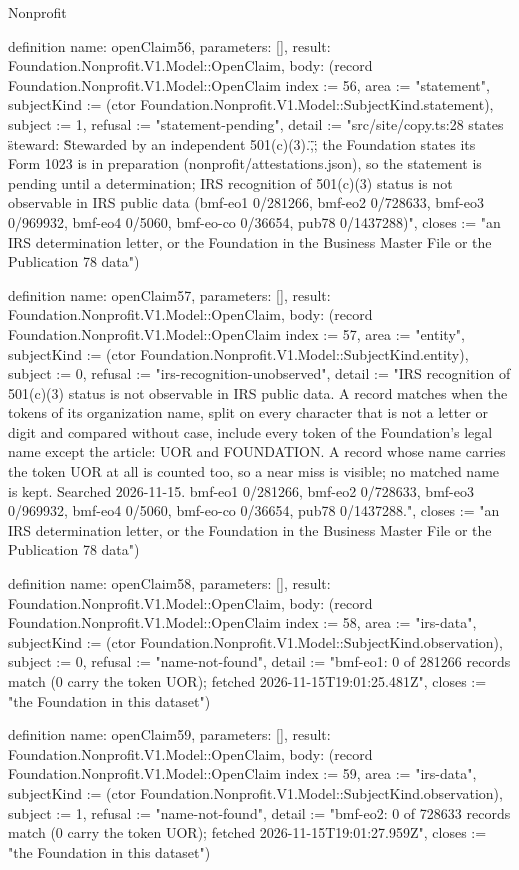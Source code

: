 \begin{lexlean}{Nonprofit}
\begin{semanticmodule}
definition{
  name: openClaim56,
  parameters: [],
  result: Foundation.Nonprofit.V1.Model::OpenClaim,
  body: (record Foundation.Nonprofit.V1.Model::OpenClaim {index := 56, area := "statement", subjectKind := (ctor Foundation.Nonprofit.V1.Model::SubjectKind.statement), subject := 1, refusal := "statement-pending", detail := "src/site/copy.ts:28 states \"steward: \"Stewarded by an independent 501(c)(3).\",\"; the Foundation states its Form 1023 is in preparation (nonprofit/attestations.json), so the statement is pending until a determination; IRS recognition of 501(c)(3) status is not observable in IRS public data (bmf-eo1 0/281266, bmf-eo2 0/728633, bmf-eo3 0/969932, bmf-eo4 0/5060, bmf-eo-co 0/36654, pub78 0/1437288)", closes := "an IRS determination letter, or the Foundation in the Business Master File or the Publication 78 data"})
}

definition{
  name: openClaim57,
  parameters: [],
  result: Foundation.Nonprofit.V1.Model::OpenClaim,
  body: (record Foundation.Nonprofit.V1.Model::OpenClaim {index := 57, area := "entity", subjectKind := (ctor Foundation.Nonprofit.V1.Model::SubjectKind.entity), subject := 0, refusal := "irs-recognition-unobserved", detail := "IRS recognition of 501(c)(3) status is not observable in IRS public data. A record matches when the tokens of its organization name, split on every character that is not a letter or digit and compared without case, include every token of the Foundation's legal name except the article: UOR and FOUNDATION. A record whose name carries the token UOR at all is counted too, so a near miss is visible; no matched name is kept. Searched 2026-11-15. bmf-eo1 0/281266, bmf-eo2 0/728633, bmf-eo3 0/969932, bmf-eo4 0/5060, bmf-eo-co 0/36654, pub78 0/1437288.", closes := "an IRS determination letter, or the Foundation in the Business Master File or the Publication 78 data"})
}

definition{
  name: openClaim58,
  parameters: [],
  result: Foundation.Nonprofit.V1.Model::OpenClaim,
  body: (record Foundation.Nonprofit.V1.Model::OpenClaim {index := 58, area := "irs-data", subjectKind := (ctor Foundation.Nonprofit.V1.Model::SubjectKind.observation), subject := 0, refusal := "name-not-found", detail := "bmf-eo1: 0 of 281266 records match (0 carry the token UOR); fetched 2026-11-15T19:01:25.481Z", closes := "the Foundation in this dataset"})
}

definition{
  name: openClaim59,
  parameters: [],
  result: Foundation.Nonprofit.V1.Model::OpenClaim,
  body: (record Foundation.Nonprofit.V1.Model::OpenClaim {index := 59, area := "irs-data", subjectKind := (ctor Foundation.Nonprofit.V1.Model::SubjectKind.observation), subject := 1, refusal := "name-not-found", detail := "bmf-eo2: 0 of 728633 records match (0 carry the token UOR); fetched 2026-11-15T19:01:27.959Z", closes := "the Foundation in this dataset"})
}


\end{semanticmodule}
\end{lexlean}
